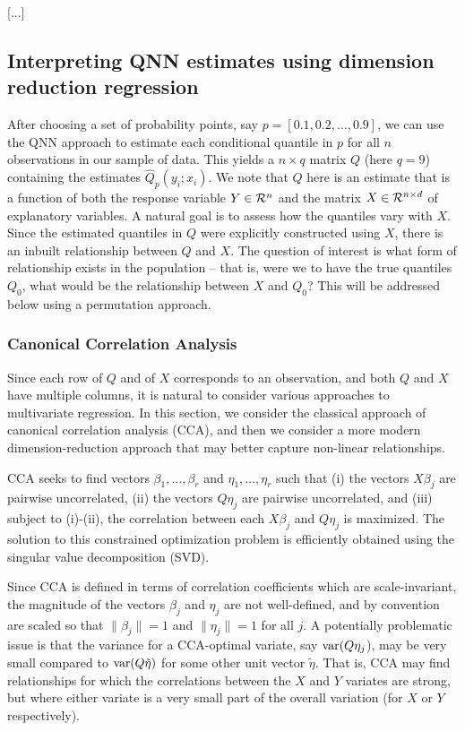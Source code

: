 [...]

\subsection{Interpreting QNN estimates using dimension reduction
regression}

After choosing a set of probability points, say $p=[0.1, 0.2, \ldots,
0.9]$, we can use the QNN approach to estimate each conditional quantile
in $p$ for all $n$ observations in our sample of data.  This yields
a $n\times q$ matrix $Q$ (here $q=9$) containing the estimates
$\hat{Q}_p(y_i; x_i)$.  We note that $Q$ here is an estimate that is a
function of both the response variable $Y\in {\cal R}^n$ and the matrix
$X\in {\cal R}^{n\times d}$ of explanatory variables.  A natural goal
is to assess how the quantiles vary with $X$.  Since the estimated
quantiles in $Q$ were explicitly constructed using $X$, there is an
inbuilt relationship between $Q$ and $X$.  The question of interest is
what form of relationship exists in the population -- that is, were we to
have the true quantiles $Q_0$, what would be the relationship between $X$
and $Q_0$?  This will be addressed below using a permutation approach.

\subsubsection{Canonical Correlation Analysis}

Since each row of $Q$ and of $X$ corresponds to an observation, and both
$Q$ and $X$ have multiple columns, it is natural to consider various
approaches to multivariate regression.  In this section, we consider
the classical approach of canonical correlation analysis (CCA), and then
we consider a more modern dimension-reduction approach that may better
capture non-linear relationships.

CCA seeks to find vectors $\beta_1, \ldots, \beta_r$ and $\eta_1, \ldots,
\eta_r$ such that (i) the vectors $X\beta_j$ are pairwise uncorrelated,
(ii) the vectors $Q\eta_j$ are pairwise uncorrelated, and (iii) subject
to (i)-(ii), the correlation between each $X\beta_j$ and $Q\eta_j$
is maximized.  The solution to this constrained optimization problem is
efficiently obtained using the singular value decomposition (SVD).

Since CCA is defined in terms of correlation coefficients which are
scale-invariant, the magnitude of the vectors $\beta_j$ and $\eta_j$
are not well-defined, and by convention are scaled so that $\|\beta_j\|
= 1$ and $\|\eta_j\| = 1$ for all $j$.  A potentially problematic issue
is that the variance for a CCA-optimal variate, say ${\rm var}(Q\eta_j$),
may be very small compared to ${\rm var}(Q\tilde{\eta})$ for some other
unit vector $\tilde{\eta}$.  That is, CCA may find relationships for
which the correlations between the $X$ and $Y$ variates are strong,
but where either variate is a very small part of the overall variation
(for $X$ or $Y$ respectively).

